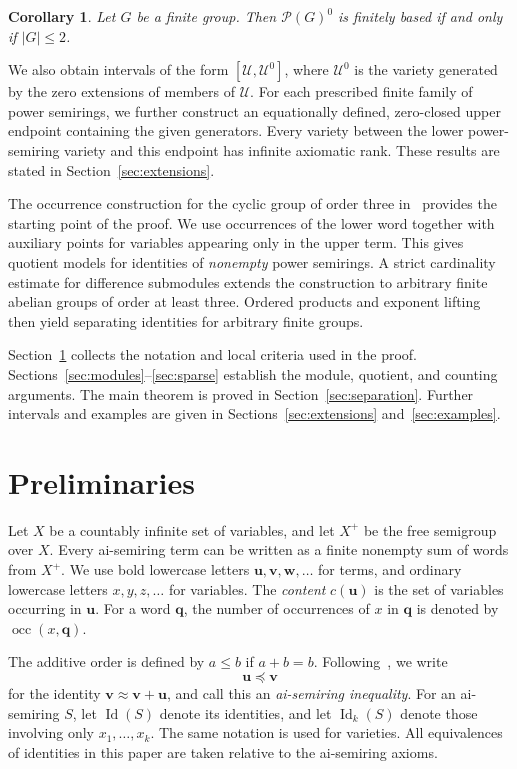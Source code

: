 \documentclass[10pt,a4paper]{amsart}
\newtheorem{corollary}[theorem]{Corollary}
\numberwithin{equation}{section}
\newcommand{\Full}[1]{\mathcal{P}(#1)^0}
\newcommand{\Id}{\operatorname{Id}}
\newcommand{\occ}{\operatorname{occ}}
\newcommand{\bu}{\mathbf{u}}
\newcommand{\bv}{\mathbf{v}}
\newcommand{\bw}{\mathbf{w}}
\newcommand{\bq}{\mathbf{q}}
\newcommand{\calU}{\mathcal{U}}
\renewcommand{\leq}{\leqslant}
\begin{document}
\begin{corollary}\label{thm:classification}
Let $G$ be a finite group. Then $\Full{G}$ is finitely based if and only if $|G|\leq 2$.
\end{corollary}

We also obtain intervals of the form $[\calU,\calU^0]$, where $\calU^0$ is the variety generated by the zero extensions of members of $\calU$. For each prescribed finite family of power semirings, we further construct an equationally defined, zero-closed upper endpoint containing the given generators. Every variety between the lower power-semiring variety and this endpoint has infinite axiomatic rank. These results are stated in Section~\ref{sec:extensions}.

The occurrence construction for the cyclic group of order three in~\cite{note} provides the starting point of the proof. We use occurrences of the lower word together with auxiliary points for variables appearing only in the upper term. This gives quotient models for identities of \emph{nonempty} power semirings. A strict cardinality estimate for difference submodules extends the construction to arbitrary finite abelian groups of order at least three. Ordered products and exponent lifting then yield separating identities for arbitrary finite groups.

Section~\ref{sec:prelim} collects the notation and local criteria used in the proof. Sections~\ref{sec:modules}--\ref{sec:sparse} establish the module, quotient, and counting arguments. The main theorem is proved in Section~\ref{sec:separation}. Further intervals and examples are given in Sections~\ref{sec:extensions} and~\ref{sec:examples}.

\section{Preliminaries}\label{sec:prelim}
Let $X$ be a countably infinite set of variables, and let $X^+$ be the free semigroup over $X$. Every ai-semiring term can be written as a finite nonempty sum of words from $X^+$. We use bold lowercase letters $\bu,\bv,\bw,\ldots$ for terms, and ordinary lowercase letters $x,y,z,\ldots$ for variables. The \emph{content} $c(\bu)$ is the set of variables occurring in $\bu$. For a word $\bq$, the number of occurrences of $x$ in $\bq$ is denoted by $\occ(x,\bq)$.

The additive order is defined by $a\leq b$ if $a+b=b$. Following~\cite{grsy}, we write
\[
 \bu\preceq\bv
\]
for the identity $\bv\approx\bv+\bu$, and call this an \emph{ai-semiring inequality}. For an ai-semiring $S$, let $\Id(S)$ denote its identities, and let $\Id_k(S)$ denote those involving only $x_1,\ldots,x_k$. The same notation is used for varieties. All equivalences of identities in this paper are taken relative to the ai-semiring axioms.
\end{document}
